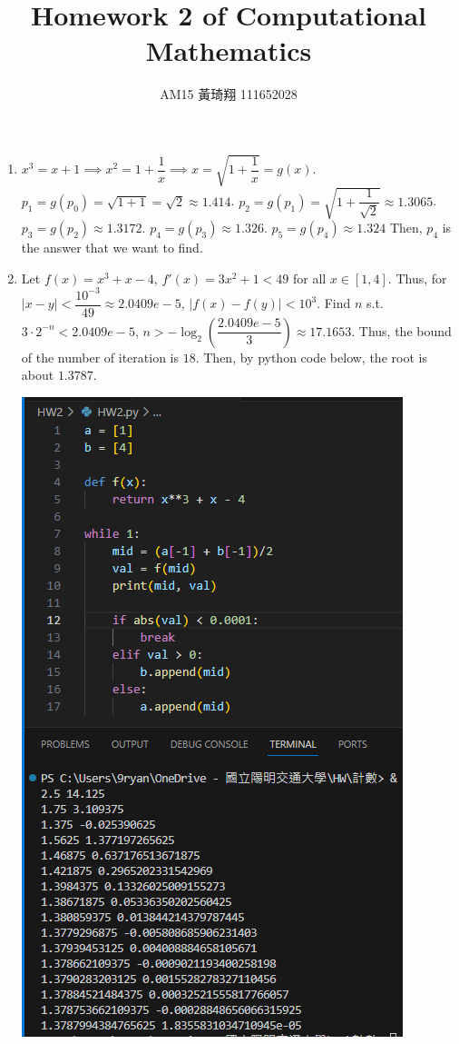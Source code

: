 \documentclass[12pt]{article}
\title{Homework 2 of Computational Mathematics}
\author{AM15 黃琦翔 111652028}
\begin{document}
\maketitle
\begin{enumerate}
    \item $x^3 = x + 1\implies x^2 = 1 + \dfrac{1}{x}\implies x = \sqrt{1 + \dfrac{1}{x}} = g(x)$.
    $p_1 = g(p_0) = \sqrt{1 + 1} = \sqrt{2} \approx 1.414$.
    $p_2 = g(p_1) = \sqrt{1 + \dfrac{1}{\sqrt{2}}} \approx 1.3065$.
    $p_3 = g(p_2) \approx 1.3172$.
    $p_4 = g(p_3) \approx 1.326$.
    $p_5 = g(p_4) \approx 1.324$ 
    Then, $p_4$ is the answer that we want to find.

    \item Let $f(x) = x^3 + x - 4$, $f'(x) = 3x^2 + 1 < 49$ for all $x\in [1, 4]$.
    Thus, for $|x - y| < \dfrac{10^{-3}}{49} \approx 2.0409e-5$, $|f(x) - f(y)| < 10^3$.
    Find $n$ s.t. $3 \cdot 2^{-n} < 2.0409e-5$, $n > -\log_2(\dfrac{2.0409e-5}{3}) \approx 17.1653$.
    Thus, the bound of the number of iteration is $18$.
    Then, by python code below, the root is about $1.3787$.

    \includegraphics[scale = 0.6]{2024-03-22-214359}


\end{enumerate}
\end{document}

